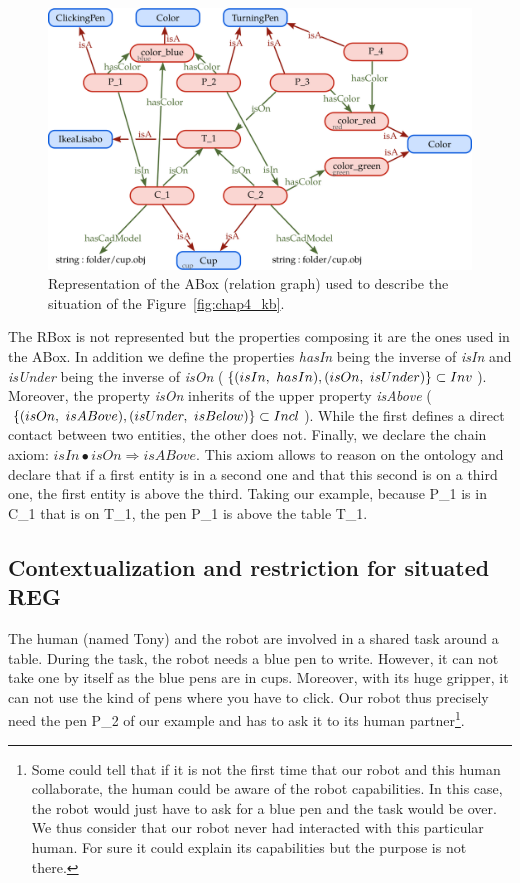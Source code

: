 \begin{figure}[ht!]
\centering
\includegraphics[scale=0.38]{figures/chapter4/pens_Abox.png}
\caption{\label{fig:chap4_kb_Abox} Representation of the ABox (relation graph) used to describe the situation of the Figure~\ref{fig:chap4_kb}. }
\end{figure}

The RBox is not represented but the properties composing it are the ones used in the ABox. In addition we define the properties \textit{hasIn} being the inverse of \textit{isIn} and \textit{isUnder} being the inverse of \textit{isOn} ($\{(isIn,\ hasIn), (isOn,\ isUnder)\} \subset \invset$). Moreover, the property \textit{isOn} inherits of the upper property \textit{isAbove} ($\{(isOn,\ isABove), (isUnder,\ isBelow)\} \subset Incl$). While the first defines a direct contact between two entities, the other does not. Finally, we declare the chain axiom: $isIn \bullet isOn \Rightarrow isABove$. This axiom allows to reason on the ontology and declare that if a first entity is in a second one and that this second is on a third one, the first entity is above the third. Taking our example, because P\_1 is in C\_1 that is on T\_1, the pen P\_1 is above the table T\_1.

\subsection{Contextualization and restriction for situated REG}

The human (named Tony) and the robot are involved in a shared task around a table. During the task, the robot needs a blue pen to write. However, it can not take one by itself as the blue pens are in cups. Moreover, with its huge gripper, it can not use the kind of pens where you have to click. Our robot thus precisely need the pen P\_2 of our example and has to ask it to its human partner\footnote{Some could tell that if it is not the first time that our robot and this human collaborate, the human could be aware of the robot capabilities. In this case, the robot would just have to ask for a blue pen and the task would be over. We thus consider that our robot never had interacted with this particular human. For sure it could explain its capabilities but the purpose is not there.}.

